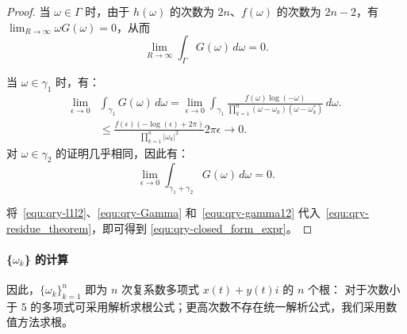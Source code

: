 \begin{proof}
    当 \(\omega \in \Gamma\) 时，由于 $h(\omega)$ 的次数为 $2n$、$f(\omega)$ 的次数为 $2n-2$，有 $\lim_{R\to \infty}\omega G(\omega)=0$，从而
    \begin{equation}\label{equ:qry-Gamma}
        \lim\limits_{R\to \infty}\int_{\Gamma} G(\omega) \, d\omega=0.
    \end{equation}   
    
    当 $\omega \in \gamma_1$ 时，有：
    \begin{equation}
    \begin{aligned}
       \lim\limits_{\epsilon\to 0} &\int_{\gamma_1} G(\omega) \, d\omega=\lim\limits_{\epsilon\to 0}\int_{\gamma_1} \frac{f(\omega) \log(-\omega)}{\prod_{k=1}^n(\omega-\omega_k)(\omega-\omega_k^*)}\, d\omega.\\
       &\leq \frac{f(\epsilon) (-\log(\epsilon)+2 \pi)}{\prod_{k=1}^n |\omega_k|^2}2 \pi \epsilon \to 0.
       \end{aligned}
    \end{equation}
    对 $\omega \in \gamma_2$ 的证明几乎相同，因此有：
    \begin{equation}\label{equ:qry-gamma12}
       \lim\limits_{\epsilon\to 0} \int_{\gamma_1+\gamma_2} G(\omega) \, d\omega=0.
    \end{equation}
    
    将~\eqref{equ:qry-l1l2}、\eqref{equ:qry-Gamma} 和~\eqref{equ:qry-gamma12} 代入~\eqref{equ:qry-residue_theorem}，即可得到 \eqref{equ:qry-closed_form_expr}。
\end{proof}

\paragraph{\{$\omega_k$\} 的计算}
因此，$\{\omega_k\}_{k=1}^n$ 即为 $n$ 次复系数多项式 $x(t)+y(t)i$ 的 $n$ 个根：
对于次数小于 5 的多项式可采用解析求根公式；更高次数不存在统一解析公式，我们采用数值方法求根。

